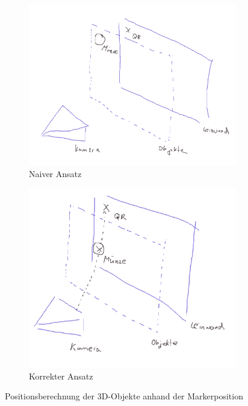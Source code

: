 \begin{figure}[!h]
  \centering
    \begin{subfigure}{0.42\textwidth}
      \centering
        \includegraphics[width=\textwidth]{graphics/position_skizze_falsch}
      \caption{Naiver Ansatz}
    \end{subfigure}%
    \begin{subfigure}{0.42\textwidth}
      \centering
        \includegraphics[width=\textwidth]{graphics/position_skizze_richtig}
      \caption{Korrekter Ansatz}
    \end{subfigure}
    \caption{Positionsberechnung der 3D-Objekte anhand der Markerposition}
    \label{fig:position_sketch}
\end{figure}

